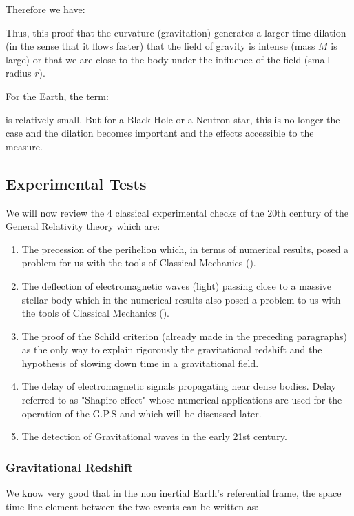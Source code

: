 	Therefore we have:
	
	Thus, this proof that the curvature (gravitation) generates a larger time dilation (in the sense that it flows faster) that the field of gravity is intense (mass $M$ is large) or that we are close to the body under the influence of the field (small radius $r$).

	For the Earth, the term:
	
	is relatively small. But for a Black Hole or a Neutron star, this is no longer the case and the dilation becomes important and the effects accessible to the measure.
	
	\subsection{Experimental Tests}	
	We will now review the $4$ classical experimental checks of the $20$th century of the General Relativity theory which are:
	\begin{enumerate}
		\item The precession of the perihelion which, in terms of numerical results, posed a problem for us with the tools of Classical Mechanics ().

		\item The deflection of electromagnetic waves (light) passing close to a massive stellar body which in the numerical results also posed a problem to us with the tools of Classical Mechanics ().

		\item The proof of the Schild criterion (already made in the preceding paragraphs) as the only way to explain rigorously the gravitational redshift and the hypothesis of slowing down time in a gravitational field.

		\item The delay of electromagnetic signals propagating near dense bodies. Delay referred to as "Shapiro effect" whose numerical applications are used for the operation of the G.P.S and which will be discussed later.
		
		\item The detection of Gravitational waves in the early 21st century.
	\end{enumerate}
	\subsubsection{Gravitational Redshift}
	We know very good that in the non inertial Earth's referential frame, the space time line element between the two events can be written as:
	
